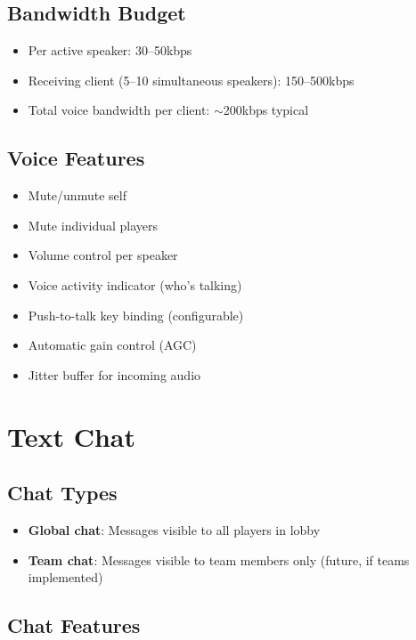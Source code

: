 \documentclass[11pt]{article}
\begin{document}
\subsection{Bandwidth Budget}

\begin{itemize}
  \item Per active speaker: 30--50kbps
  \item Receiving client (5--10 simultaneous speakers): 150--500kbps
  \item Total voice bandwidth per client: $\sim$200kbps typical
\end{itemize}

\subsection{Voice Features}

\begin{itemize}
  \item Mute/unmute self
  \item Mute individual players
  \item Volume control per speaker
  \item Voice activity indicator (who's talking)
  \item Push-to-talk key binding (configurable)
  \item Automatic gain control (AGC)
  \item Jitter buffer for incoming audio
\end{itemize}

\section{Text Chat}

\subsection{Chat Types}

\begin{itemize}
  \item \textbf{Global chat}: Messages visible to all players in lobby
  \item \textbf{Team chat}: Messages visible to team members only (future, if teams implemented)
\end{itemize}

\subsection{Chat Features}
\end{document}
